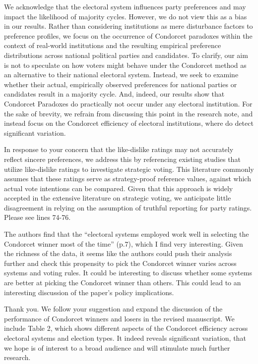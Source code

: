 \documentclass[a4paper, 12pt]{scrartcl}
\theoremstyle{break}
\newenvironment{changes}{\par\color{violet}\par\addvspace{\baselineskip}}{\par\addvspace{\baselineskip}}
\begin{document}
We acknowledge that the electoral system influences party preferences and may impact the likelihood of majority cycles. However, we do not view this as a bias in our results. Rather than considering institutions as mere disturbance factors to preference profiles, we focus on the occurrence of Condorcet paradoxes within the context of real-world institutions and the resulting empirical preference distributions across national political parties and candidates. To clarify, our aim is not to speculate on how voters might behave under the Condorcet method as an alternative to their national electoral system. Instead, we seek to examine whether their actual, empirically observed preferences for national parties or candidates result in a majority cycle. And, indeed, our results show that Condorcet Paradoxes do practically not occur under any electoral institution. For the sake of brevity, we refrain from discussing this point in the research note, and instead focus on the Condorcet efficiency of electoral institutions, where do detect significant variation.

In response to your concern that the like-dislike ratings may not accurately reflect sincere preferences, we address this by referencing existing studies that utilize like-dislike ratings to investigate strategic voting. This literature commonly assumes that these ratings serve as strategy-proof reference values, against which actual vote intentions can be compared. Given that this approach is widely accepted in the extensive literature on strategic voting, we anticipate little disagreement in relying on the assumption of truthful reporting for party ratings. Please see lines 74-76. 


\begin{changes}
The authors ﬁnd that the “electoral systems employed work well in selecting the Condorcet winner most of the time” (p.7), which I ﬁnd very interesting. Given the richness of the data, it seems like the authors could push their analysis further and check this propensity to pick the 	Condorcet winner varies across systems and voting rules. It could be interesting to discuss whether some systems are better at picking the Condorcet winner than others. This could lead to an interesting discussion of the paper’s policy implications.
\end{changes}

Thank you. We follow your suggestion and expand the discussion of the performance of Condorcet winners and losers in the revised manuscript. We include Table 2, which shows different aspects of the Condorcet efficiency across electoral systems and election types. It indeed reveals significant variation, that we hope is of interest to a broad audience and will stimulate much further research. 
\end{document}
